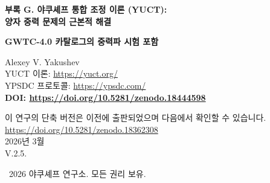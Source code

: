 \documentclass[11pt,a4paper]{article}
\theoremstyle{remark}
\newcommand{\Keff}{K_{\mathrm{eff}}}
\begin{document}
	
	\begin{titlepage}
		\begin{center}
			\vspace*{0cm}
			
			\Huge\textbf{부록 G. 야쿠셰프 통합 조정 이론 (YUCT): \\ 양자 중력 문제의 근본적 해결}
			
			\vspace{0.3cm}
			\Large\textbf{GWTC-4.0 카탈로그의 중력파 시험 포함}
			
			\vspace{0.8cm}
			\Large
			Alexey V. Yakushev\\
			
			YUCT 이론: \url{https://yuct.org/}\\
			YPSDC 프로토콜: \url{https://ypsdc.com/}\\
			
			\vspace{1.5cm}
			\textbf{DOI: \url{https://doi.org/10.5281/zenodo.18444598}}\\
			
			\vspace{0.5cm}
			
			\large
			이 연구의 단축 버전은 이전에 출판되었으며 다음에서 확인할 수 있습니다.\\ \url{https://doi.org/10.5281/zenodo.18362308}\\
			
			\vspace{0.5cm}
			2026년 3월 \\ \large V.2.5.
			
			\vspace{3cm}
			\textcopyright~2026 야쿠셰프 연구소. 모든 권리 보유.
			
			\newpage
			
			\begin{abstract}
				\noindent
				본 논문은 양자 중력 문제에 대한 결정적 해결책으로서 야쿠셰프 통합 조정 이론(YUCT)의 완전한 수학적 정식화를 제시한다. 시공간이나 중력자를 양자화하려는 기존 접근법과 달리, YUCT는 양자역학과 일반 상대성 이론 모두가 보다 근본적인 \emph{조정} 원리에서 창발한다고 가정한다. 우리는 다음을 발전시킨다: (1) 조정장 $\Psi_{MN}$을 갖는 19차원 기하학적 프레임워크, (2) 존재론적 기초로서의 D+I•R 삼위일체, (3) 조정 효율 $\Keff$을 통해 모든 물리적 상호작용을 통합하는 총 라그랑지언 $\mathcal{L}_{\text{YUCT}}$, (4) 극한 사례로서의 양자 역학 및 중력 기하학의 도출, (5) 실험실 및 천체물리학적 규모에서 시험 가능한 양자-중력 현상에 대한 구체적인 예측. 이 이론은 양자 비국소성과 상대론적 인과율 사이의 개념적 모순을 제거하고, 암흑 에너지와 암흑 물질에 대한 자연스러운 설명을 제공하며, "양자 중력 문제"가 조정 시스템의 일반 이론으로 해소되는 수학적으로 일관된 프레임워크를 제공한다.
				

\end{abstract}
\end{center}
\end{titlepage}
\end{document}

